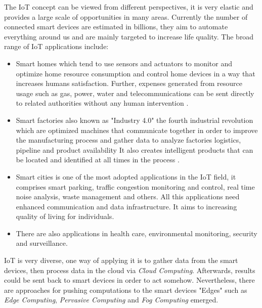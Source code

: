 \noindent The IoT concept can be viewed from different perspectives, it is very elastic and provides a large scale of opportunities in many areas. Currently the number of connected smart devices are estimated in billions, they aim to automate everything around us and are mainly targeted to increase life quality. The broad range of IoT applications include:
\begin{itemize}
\item Smart homes which tend to use sensors and actuators to monitor and optimize home resource consumption and control home devices in a way that increases humans satisfaction. Further, expenses generated from resource usage such as gas, power, water and telecommunications can be sent directly to related authorities without any human intervention \cite{Chan:2008:RSH:1377032.1377113}.  
\item Smart factories also known as "Industry 4.0" the fourth industrial revolution which are optimized machines that communicate together in order to improve the manufacturing process and gather data to analyze factories logistics, pipeline and product availability It also creates intelligent products that can be located and identified at all times in the process \cite{Gilchrist:2016:III:2994178}.

\item Smart cities is one of the most adopted applications in the IoT field, it comprises smart parking, traffic congestion monitoring and control, real time noise analysis, waste management and others.  All this applications need enhanced communication and data infrastructure. It aims to increasing quality of living for individuals\cite{6740844}. 

\item There are also applications in  health care, environmental monitoring, security and surveillance.
\end{itemize}

\noindent IoT is very diverse, one way of applying it is to gather data from the smart devices, then process data in the cloud via \textit{Cloud Computing}. Afterwards, results could be sent back to smart devices in order to act somehow. Nevertheless, there are approaches for pushing computations to the smart devices "Edges"  such as 
\textit{Edge Computing}, \textit{Pervasive Computing} and \textit{Fog Computing} emerged.




